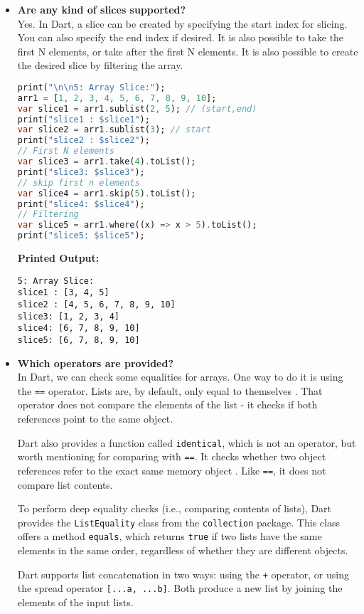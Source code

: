 \documentclass{article}
\begin{document}
\begin{itemize}
\item \textbf{Are any kind of slices supported?} \\
Yes. In Dart, a slice can be created by specifying the start index for slicing. You can also specify the end index if desired. It is also possible to take the first N elements, or take after the first N elements. It is also possible to create the desired slice by filtering the array. 
\begin{lstlisting}[language=Dart]
print("\n\n5: Array Slice:");
arr1 = [1, 2, 3, 4, 5, 6, 7, 8, 9, 10];
var slice1 = arr1.sublist(2, 5); // (start,end)
print("slice1 : $slice1"); 
var slice2 = arr1.sublist(3); // start
print("slice2 : $slice2");
// First N elements
var slice3 = arr1.take(4).toList();
print("slice3: $slice3");
// skip first n elements
var slice4 = arr1.skip(5).toList();
print("slice4: $slice4");
// Filtering
var slice5 = arr1.where((x) => x > 5).toList();
print("slice5: $slice5");
\end{lstlisting}
\textbf{Printed Output:}
\begin{verbatim}
5: Array Slice:
slice1 : [3, 4, 5]
slice2 : [4, 5, 6, 7, 8, 9, 10]
slice3: [1, 2, 3, 4]
slice4: [6, 7, 8, 9, 10]
slice5: [6, 7, 8, 9, 10]
\end{verbatim}



\item \textbf{Which operators are provided?} \\
In Dart, we can check some equalities for arrays. One way to do it is using the \texttt{==} operator. Lists are, by default, only equal to themselves \cite{dartdocs}. That operator does not compare the elements of the list \mbox{-} it checks if both references point to the same object.

Dart also provides a function called \texttt{identical}, which is not an operator, but worth mentioning for comparing with \texttt{==}. It checks whether two object references refer to the exact same memory object \cite{dartdocs}. Like \texttt{==}, it does not compare list contents.

To perform deep equality checks (i.e., comparing contents of lists), Dart provides the \texttt{ListEquality} class from the \texttt{collection} package. This class offers a method \texttt{equals}, which returns \texttt{true} if two lists have the same elements in the same order, regardless of whether they are different objects.

Dart supports list concatenation in two ways: using the \texttt{+} operator, or using the spread operator \texttt{[...a, ...b]}. Both produce a new list by joining the elements of the input lists.


\end{itemize}
\end{document}
